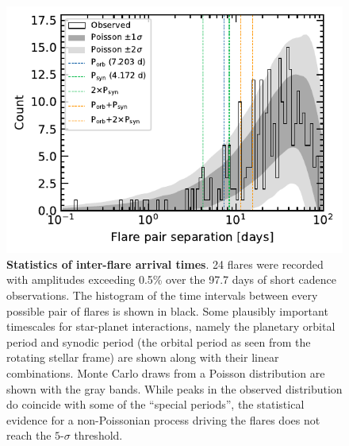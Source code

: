 \documentclass[12pt,modern,twocolumn,tighten]{aastex63}
\begin{document}
\begin{figure}[t]
	\begin{center}
		\leavevmode
		\includegraphics[width=1.0\textwidth]{f13.pdf}
	\end{center}
	\vspace{-0.7cm}
	\caption{
		{\bf Statistics of inter-flare arrival times}.  
    24 flares were recorded with amplitudes exceeding 0.5\% over the
    97.7 days of short cadence observations.  The histogram of the
    time intervals between every possible pair of flares is shown in
    black.  Some plausibly important timescales for star-planet
    interactions, namely the planetary orbital period and synodic
    period (the orbital period as seen from the rotating stellar frame) are
    shown along with their linear combinations.  Monte Carlo
    draws from a Poisson distribution are shown
    with the gray bands.  While peaks in the observed distribution do
    coincide with some of the ``special periods'', the
    statistical evidence for a non-Poissonian process driving the
    flares does not reach the $5$-$\sigma$ threshold.
		\label{fig:flarestats}
	}
\end{figure}
\end{document}
